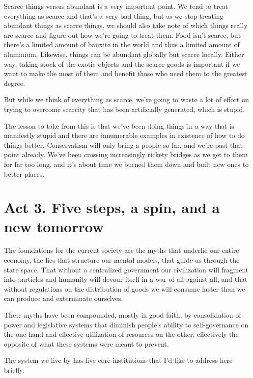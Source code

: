 Scarce things versus abundant is a very important point. We tend to treat
everything as scarce and that's a very bad thing, but as we stop treating
abundant things as scarce things, we should also take note of which things
really are scarce and f\hbox{}igure out how we're going to treat them. Food
isn't scarce, but there's a limited amount of bauxite in the world and thus a
limited amount of aluminium. Likewise, things can be abundant globally but
scarce locally. Either way, taking stock of the exotic objects and the scarce
goods is important if we want to make the most of them and benef\hbox{}it those
who need them to the greatest degree.

But while we think of everything as scarce, we're going to waste a lot of
ef\hbox{}fort on trying to overcome scarcity that has been artif\hbox{}icially
generated, which is stupid.

The lesson to take from this is that we've been doing things in a way that is
manifestly stupid and there are innumerable examples in existence of how to do
things better. Conservatism will only bring a people so far, and we're past 
that point already. We've been crossing increasingly rickety bridges as we get
to them for far too long, and it's about time we burned them down and built new
ones to better places.


\section{Act 3. F\hbox{}ive steps, a spin, and a new tomorrow}
\label{s:artificial_scarcity:five_steps}

The foundations for the current society are the myths that underlie our entire
economy, the lies that structure our mental models, that guide us through the
state space. That without a centralized government our civilization will
fragment into particles and humanity will devour itself in a war of all against
all, and that without regulations on the distribution of goods we will consume
faster than we can produce and exterminate ourselves.

These myths have been compounded, mostly in good faith, by consolidation of
power and legislative systems that diminish people's ability to self-governance
on the one hand and ef\hbox{}fective utilization of resources on the other,
ef\hbox{}fectively the opposite of what these systems were meant to prevent.

The system we live by has f\hbox{}ive core institutions that I'd like to address
here brief\hbox{}ly.

